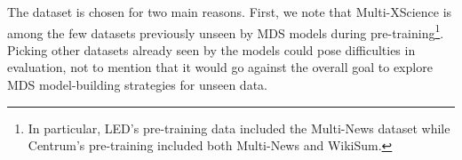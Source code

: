 \documentclass[12pt, twocolumn]{article}
\numberwithin{equation}{section}
\begin{document}

The dataset is chosen for two main reasons.  First, we note that Multi-XScience is among the few datasets previously unseen by MDS models during pre-training\footnote{In particular, LED’s pre-training data included the Multi-News dataset while Centrum’s pre-training included both Multi-News and WikiSum.}. Picking other datasets already seen by the models could pose difficulties in evaluation, not to mention that it would go against the overall goal to explore MDS model-building strategies for unseen data. 
\end{document}
